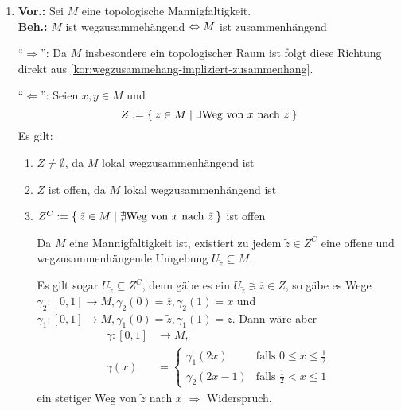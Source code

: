 \begin{solution}[\ref{ub4:aufg1}]
    \begin{enumerate}[label=(\alph*)]
        \item \textbf{Vor.:} Sei $M$ eine topologische Mannigfaltigkeit.\\
              \textbf{Beh.:} $M$ ist wegzusammehängend $\Leftrightarrow M$ ist zusammenhängend
              \begin{beweis}
                \enquote{$\Rightarrow$}: Da $M$ insbesondere ein
                topologischer Raum ist folgt diese Richtung direkt 
                aus \cref{kor:wegzusammehang-impliziert-zusammenhang}.

                \enquote{$\Leftarrow$}: Seien $x,y \in M$ und
                \[Z := \Set{z \in M | \exists \text{Weg von } x \text{ nach } z}\]
                Es gilt:
                \begin{enumerate}[label=(\roman*)]
                    \item $Z \neq \emptyset$, da $M$ lokal wegzusammenhängend ist
                    \item $Z$ ist offen, da $M$ lokal wegzusammenhängend ist
                    \item $Z^C := \Set{\tilde{z} \in M | \nexists \text{Weg von } x \text{ nach } \tilde{z}}$ ist offen

                    Da $M$ eine Mannigfaltigkeit ist, existiert zu jedem
                    $\tilde{z} \in Z^C$ eine offene und wegzusammenhängende Umgebung 
                    $U_{\tilde{z}} \subseteq M$.

                    Es gilt sogar $U_{\tilde{z}} \subseteq Z^C$, denn
                    gäbe es ein $U_{\tilde{z}} \ni \overline{z} \in Z$,
                    so gäbe es Wege $\gamma_2:[0,1] \rightarrow M, \gamma_2(0) = \overline{z}, \gamma_2(1) = x$
                    und $\gamma_1:[0,1] \rightarrow M, \gamma_1(0) = \tilde{z}, \gamma_1(1) = \overline{z}$.
                    Dann wäre aber
                    \begin{align*}
                        \gamma:[0,1] &\rightarrow M,\\
                        \gamma(x) &= \begin{cases}
                            \gamma_1(2x)   &\text{falls } 0 \leq x \leq \frac{1}{2}\\
                            \gamma_2(2x-1) &\text{falls } \frac{1}{2} < x \leq 1
                            \end{cases}
                    \end{align*}
                    ein stetiger Weg von $\tilde{z}$ nach $x$
                    $\Rightarrow$ Widerspruch.


\end{enumerate}
\end{beweis}
\end{enumerate}
\end{solution}
